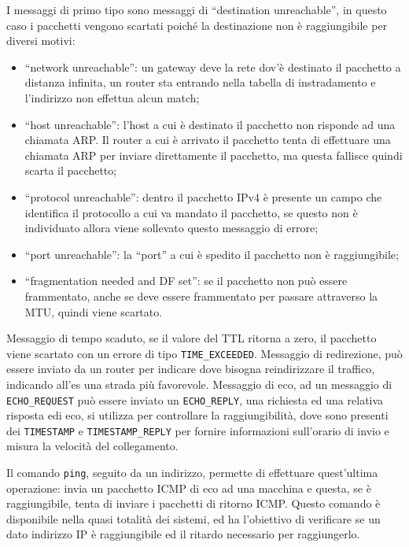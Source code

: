 \documentclass{article}
\numberwithin{equation}{subsection}
\begin{document}
I messaggi di primo tipo sono messaggi di ``destination unreachable'', in questo caso i pacchetti vengono scartati poiché la destinazione non è raggiungibile per diversi 
motivi:
\begin{itemize}
    \item ``network unreachable'': un gateway deve la rete dov'è destinato il pacchetto a distanza infinita, un router sta entrando nella tabella di instradamento e l'indirizzo non effettua alcun match;
    \item ``host unreachable'': l'host a cui è destinato il pacchetto non risponde ad una chiamata ARP. Il router a cui è arrivato il pacchetto tenta di effettuare una chiamata ARP per inviare direttamente il pacchetto, ma questa fallisce quindi scarta il pacchetto;
    \item ``protocol unreachable'': dentro il pacchetto IPv4 è presente un campo che identifica il protocollo a cui va mandato il pacchetto, se questo non è individuato allora viene sollevato questo messaggio di errore;
    \item ``port unreachable'': la ``port'' a cui è spedito il pacchetto non è raggiungibile;
    \item ``fragmentation needed and DF set'': se il pacchetto non può essere frammentato, anche se deve essere frammentato per passare attraverso la MTU, quindi viene scartato. 
\end{itemize}

Messaggio di tempo scaduto, se il valore del TTL ritorna a zero, il pacchetto viene scartato con un errore di tipo \verb|TIME_EXCEEDED|. 
Messaggio di redirezione, può essere inviato da un router per indicare dove bisogna reindirizzare il traffico, indicando all'es una strada più favorevole. 
Messaggio di eco, ad un messaggio di \verb|ECHO_REQUEST| può essere inviato un \verb|ECHO_REPLY|, una richiesta ed una relativa risposta edi eco, si utilizza per controllare 
la raggiungibilità, dove sono presenti dei \verb|TIMESTAMP| e \verb|TIMESTAMP_REPLY| per fornire informazioni sull'orario di invio e misura la velocità del collegamento. 

Il comando \verb|ping|, seguito da un indirizzo, permette di effettuare quest'ultima operazione: invia un pacchetto ICMP di eco ad una macchina e questa, se è raggiungibile, tenta di 
inviare i pacchetti di ritorno ICMP. Questo comando è disponibile nella quasi totalità dei sistemi, ed ha l'obiettivo di verificare se un dato indirizzo IP è 
raggiungibile ed il ritardo necessario per raggiungerlo. 
\end{document}
